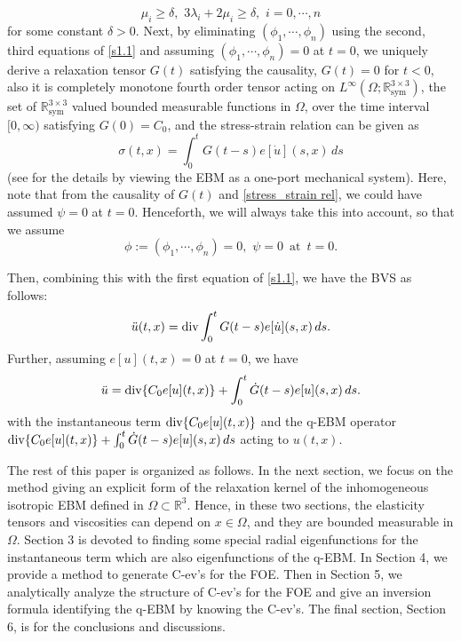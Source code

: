 \documentclass[a4paper,12pt]{article}
\newtheorem{a priori condition}[Th]{A priori condition}
\def\dvg{\mbox{\rm div}}
\begin{document}
\begin{equation}\label{strong convex}
\mu_i\ge\delta,\,\,3\lambda_i+2\mu_i\ge\delta,\,\,i=0,\cdots,n
\end{equation}
for some constant $\delta>0$.
Next, by eliminating $(\phi_1,\cdots,\phi_n)$ using the second, third equations of \eqref{s1.1} and assuming $(\phi_1,\cdots,\phi_n)=0$ at $t=0$, we uniquely derive a relaxation tensor $G(t)$ satisfying the causality, $G(t)=0$ for $t<0$, also it is completely monotone fourth order tensor acting on $L^\infty(\Omega;{\mathbb R}^{3\times3}_{\text{sym}})$, the set of ${\mathbb R}^{3\times3}_{\text{sym}}$ valued bounded measurable functions in $\Omega$, over the time interval $[0,\infty)$ satisfying $G(0)=C_0$, and the stress-strain relation can be given as
\begin{equation}\label{stress_strain rel}
\sigma(t,x)=\int_0^t G(t-s)e[\dot{u}](s,x)\,ds
\end{equation}
(see \cite{HKLNT, Zemanian} for the details by viewing the EBM as a one-port mechanical system). Here, note that from the causality of $G(t)$ and \eqref{stress_strain rel}, we could have assumed $\psi=0$ at $t=0$. Henceforth, we will always take this into account, so that we assume
\begin{equation}\label{zero initial strains}
\phi:=(\phi_1,\cdots,\phi_n)=0,\,\,\psi=0\,\,\,\text{at}\,\,\,t=0.
\end{equation}

Then, combining this with the first equation of \eqref{s1.1}, we have
the BVS as follows:
\begin{equation}\label{Boltzmann_1}
\ddot{u}(t,x)=\dvg\int_0^t G(t-s)e[\dot{u}](s,x)\,ds.   \end{equation}
Further, assuming $e[u](t,x)=0$ at $t=0$, we have
\begin{equation}\label{Boltzmann_2}
\ddot{u}=\dvg\{C_0 e[u](t,x)\}+\int_0^t \dot{G}(t-s)e[u](s,x)\,ds.
\end{equation}
with the instantaneous term $\dvg\{C_0 e[u](t,x)\}$ and the q-EBM operator $\dvg\{C_0 e[u](t,x)\}+\int_0^t \dot{G}(t-s)e[u](s,x)\,ds$ acting to $u(t,x)$.

\medskip
The rest of this paper is organized as follows.
In the next section, we focus on the method giving an explicit form of the relaxation kernel of the inhomogeneous isotropic EBM defined in $\Omega\subset{\mathbb R}^3$. Hence, in these two sections, the elasticity tensors and viscosities can depend on $x\in\Omega$, and they are bounded measurable in $\Omega$. Section 3 is devoted to finding some special radial eigenfunctions for the instantaneous term which are also eigenfunctions of the q-EBM. In Section 4, we provide a method to generate C-ev's for the FOE. Then in Section 5, we analytically analyze the structure of C-ev's for the FOE and give an inversion formula identifying the q-EBM by knowing the C-ev's. The final section, Section 6, is for the conclusions and discussions.
\end{document}
